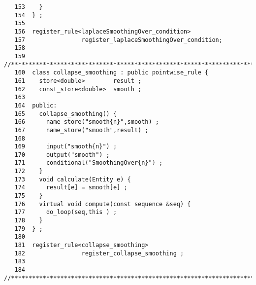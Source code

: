 \begin{verbatim}
   153    }
   154  } ;
   155
   156  register_rule<laplaceSmoothingOver_condition>
   157                register_laplaceSmoothingOver_condition;
   158
   159  //*********************************************************************
   160  class collapse_smoothing : public pointwise_rule {
   161    store<double>        result ;
   162    const_store<double>  smooth ;
   163
   164  public:
   165    collapse_smoothing() {
   166      name_store("smooth{n}",smooth) ;
   167      name_store("smooth",result) ;
   168
   169      input("smooth{n}") ;
   170      output("smooth") ;
   171      conditional("SmoothingOver{n}") ;
   172    }
   173    void calculate(Entity e) {
   174      result[e] = smooth[e] ;
   175    }
   176    virtual void compute(const sequence &seq) {
   177      do_loop(seq,this ) ;
   178    }
   179  } ;
   180
   181  register_rule<collapse_smoothing>
   182                register_collapse_smoothing ;
   183
   184  //*********************************************************************
\end{verbatim}
~
